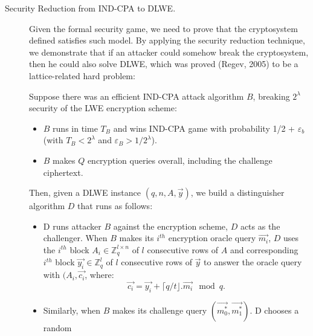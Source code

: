 \begin{description}
\begin{description}
\begin{description}
                \item [Security Reduction from IND-CPA to DLWE.] Given the formal security game,
                    we need to prove that the cryptosystem defined satisfies
                    such model. By applying the security reduction technique, we demonstrate
                    that if an attacker could somehow break the cryptosystem,
                    then he could also solve DLWE, which was proved (Regev,
                    2005) to be a
                    lattice-related hard problem:

                Suppose there was
                    an efficient IND-CPA attack algorithm $B$, breaking
                    $2^\lambda$ security of the LWE encryption scheme:
                    \begin{itemize}
                        \item $B$ runs in time $T_B$ and wins IND-CPA game with
                            probability 1/2 + $\varepsilon_b$ (with $T_B <
                            2^\lambda$ and $\varepsilon_B > 1/2^\lambda$).
                        \item $B$ makes $Q$ encryption queries overall,
                            including the challenge ciphertext.
                    \end{itemize}
                    Then, given a DLWE instance $(q,n,A,\vec{y})$, we build a
                    distinguisher
                    algorithm $D$ that runs as follows:
                    \begin{itemize}
                        \item D runs attacker $B$ against the encryption scheme, $D$ acts as the challenger. When $B$ makes its $i^{th}$
                            encryption oracle query $\vec{m_i}$, $D$ uses the
                            $i^{th}$ block $A_i \in \mathbb{Z}_q^{l \times n}$
                            of $l$ consecutive rows of $A$ and corresponding
                            $i^{th}$ block $\vec{y_i}\in \mathbb{Z}_q^l$ of
                            $l$ consecutive rows of $\vec{y}$ to answer the
                            oracle query with $(A_i, \vec{c_i}$, where:
                                \[
                                    \vec{c_i} = \vec{y_i} + \lceil q/t \rfloor .
                                    \vec{m_i} \mod q.
                                \]
                        \item Similarly, when $B$ makes its challenge query
                                $(\vec{m_0^*},\vec{m_1^*})$. D chooses a random

\end{itemize}
\end{description}
\end{description}
\end{description}
